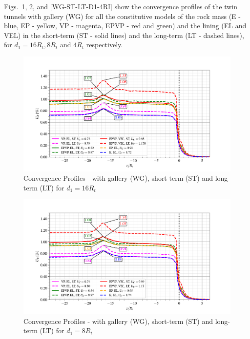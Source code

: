 \documentclass[a4paper,fleqn]{cas-sc}
\begin{document}
Figs.~\ref{WG-ST-LT-D1-16RI}, \ref{WG-ST-LT-D1-8RI}, and \ref{WG-ST-LT-D1-4RI} show the convergence profiles of the twin tunnels with gallery (WG) for all the constitutive models of the rock mass (E - blue, EP - yellow, VP - magenta, EPVP - red and green) and the lining (EL and VEL) in the short-term (ST - solid lines) and the long-term (LT - dashed lines), for $d_1 = 16R_t, 8R_t$ and $4R_t$ respectively.
\begin{figure}[h!]
	\centering
	\includegraphics[scale=0.9]{Convergence Profiles - WG_ST_LT - $d_1=16R_i$_anotate.pdf}
	\caption{Convergence Profiles - with gallery (WG), short-term (ST) and long-term (LT) for $d_1 = 16R_t$}
	\label{WG-ST-LT-D1-16RI}
\end{figure}
\FloatBarrier
\begin{figure}[h!]
	\centering
	\includegraphics[scale=0.9]{Convergence Profiles - WG_ST_LT - $d_1=8R_i$_anotate.pdf}
	\caption{Convergence Profiles - with gallery (WG), short-term (ST) and long-term (LT) for $d_1 = 8R_t$}
	\label{WG-ST-LT-D1-8RI}
\end{figure}
\FloatBarrier
\end{document}
